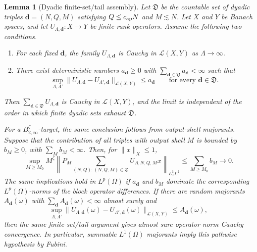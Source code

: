 \documentclass[11pt,reqno]{amsart}
\numberwithin{equation}{section}
\theoremstyle{plain}
\newtheorem{lemma}[theorem]{Lemma}
\theoremstyle{definition}
\begin{document}
\begin{lemma}[Dyadic finite-set/tail assembly]\label{lem:dyadic-tail-assembly}
Let \(\mathfrak D\) be the countable set of dyadic triples \(\mathbf d=(N,Q,M)\) satisfying \(Q\le c_{\rm ap}N\) and \(M\lesssim N\).  Let \(X\) and \(Y\) be Banach spaces, and let \(U_{\Lambda,\mathbf d}:X\to Y\) be finite-rank operators.  Assume the following two conditions.
\begin{enumerate}[label=(\roman*)]
\item For each fixed \(\mathbf d\), the family \(U_{\Lambda,\mathbf d}\) is Cauchy in \(\mathcal L(X,Y)\) as \(\Lambda\to\infty\).
\item There exist deterministic numbers \(a_{\mathbf d}\ge0\) with \(\sum_{\mathbf d\in\mathfrak D}a_{\mathbf d}<\infty\) such that
\[
        \sup_{\Lambda,\Lambda'}
        \|U_{\Lambda,\mathbf d}-U_{\Lambda',\mathbf d}\|_{\mathcal L(X,Y)}
        \le a_{\mathbf d}
        \qquad \text{for every }\mathbf d\in\mathfrak D .
\]
\end{enumerate}
Then \(\sum_{\mathbf d\in\mathfrak D}U_{\Lambda,\mathbf d}\) is Cauchy in \(\mathcal L(X,Y)\), and the limit is independent of the order in which finite dyadic sets exhaust \(\mathfrak D\).

For a \(B_{2,\infty}^{\zeta}\)-target, the same conclusion follows from output-shell majorants.  Suppose that the contribution of all triples with output shell \(M\) is bounded by \(b_M\ge0\), with \(\sum_Mb_M<\infty\).  Then, for \(\|x\|_X\le1\),
\begin{equation}\label{eq:Besov-tail-assembly}
        \sup_{M\ge M_0} M^\zeta
        \left\|P_M\sum_{(N,Q):(N,Q,M)\in\mathfrak D} U_{\Lambda,N,Q,M}x\right\|_{L_T^1L^2}
        \le \sum_{M\ge M_0} b_M
        \longrightarrow0 .
\end{equation}
The same implications hold in \(L^p(\Omega)\) if \(a_{\mathbf d}\) and \(b_M\) dominate the corresponding \(L^p(\Omega)\)-norms of the block operator differences.  If there are random majorants \(A_{\mathbf d}(\omega)\) with \(\sum_{\mathbf d}A_{\mathbf d}(\omega)<\infty\) almost surely and
\[
        \sup_{\Lambda,\Lambda'}
        \|U_{\Lambda,\mathbf d}(\omega)-U_{\Lambda',\mathbf d}(\omega)\|_{\mathcal L(X,Y)}
        \le A_{\mathbf d}(\omega),
\]
then the same finite-set/tail argument gives almost sure operator-norm Cauchy convergence.  In particular, summable \(L^1(\Omega)\) majorants imply this pathwise hypothesis by Fubini.
\end{lemma}
\end{document}
